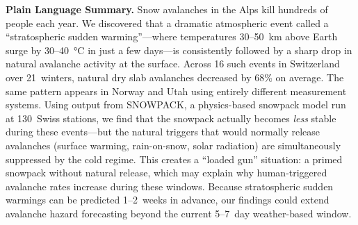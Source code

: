 \noindent\textbf{Plain Language Summary.}
Snow avalanches in the Alps kill hundreds of people each year. We discovered that a dramatic atmospheric event called a ``stratospheric sudden warming''---where temperatures 30--50~km above Earth surge by 30--40~°C in just a few days---is consistently followed by a sharp drop in natural avalanche activity at the surface. Across 16 such events in Switzerland over 21~winters, natural dry slab avalanches decreased by 68\% on average. The same pattern appears in Norway and Utah using entirely different measurement systems. Using output from SNOWPACK, a physics-based snowpack model run at 130~Swiss stations, we find that the snowpack actually becomes \emph{less} stable during these events---but the natural triggers that would normally release avalanches (surface warming, rain-on-snow, solar radiation) are simultaneously suppressed by the cold regime. This creates a ``loaded gun'' situation: a primed snowpack without natural release, which may explain why human-triggered avalanche rates increase during these windows. Because stratospheric sudden warmings can be predicted 1--2~weeks in advance, our findings could extend avalanche hazard forecasting beyond the current 5--7~day weather-based window.

